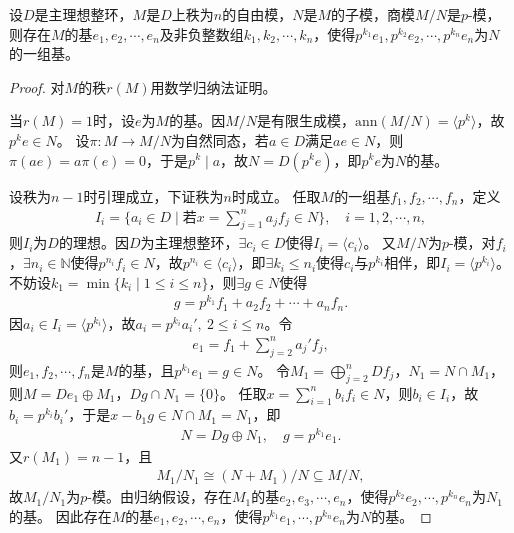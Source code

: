 \documentclass[../../main.tex]{subfiles}%
\begin{document}
\begin{lemma}
设$D$是主理想整环，$M$是$D$上秩为$n$的自由模，$N$是$M$的子模，商模$M/N$是$p$-模，则存在$M$的基$e_1,e_2,\cdots,e_n$及非负整数组$k_1,k_2,\cdots,k_n$，使得$p^{k_1}e_1,p^{k_2}e_2,\cdots,p^{k_n}e_n$为$N$的一组基。
\end{lemma}
\begin{proof}

对$M$的秩$r(M)$用数学归纳法证明。

当$r(M)=1$时，设$e$为$M$的基。因$M/N$是有限生成模，$\mathrm{ann}(M/N)=\langle p^k\rangle$，故$p^ke\in N$。
设$\pi:M\to M/N$为自然同态，若$a\in D$满足$ae\in N$，则$\pi(ae)=a\pi(e)=0$，于是$p^k\mid a$，故$N=D(p^ke)$，即$p^ke$为$N$的基。

设秩为$n-1$时引理成立，下证秩为$n$时成立。
任取$M$的一组基$f_1,f_2,\cdots,f_n$，定义
\begin{align*}
I_i=\{a_i\in D\mid \text{若}x=\sum\limits_{j=1}^{n}a_jf_j\in N\},\quad i=1,2,\cdots,n,
\end{align*}
则$I_i$为$D$的理想。因$D$为主理想整环，$\exists c_i\in D$使得$I_i=\langle c_i\rangle$。
又$M/N$为$p$-模，对$f_i$，$\exists n_i\in\mathbb{N}$使得$p^{n_i}f_i\in N$，故$p^{n_i}\in\langle c_i\rangle$，即$\exists k_i\leqslant n_i$使得$c_i$与$p^{k_i}$相伴，即$I_i=\langle p^{k_i}\rangle$。
不妨设$k_1=\min\{k_i\mid 1\leqslant i\leqslant n\}$，则$\exists g\in N$使得
\begin{align*}
g=p^{k_1}f_1+a_2f_2+\cdots+a_nf_n.
\end{align*}
因$a_i\in I_i=\langle p^{k_i}\rangle$，故$a_i=p^{k_i}a_i',\ 2\leqslant i\leqslant n$。令
\begin{align*}
e_1=f_1+\sum\limits_{j=2}^{n}a_j'f_j,
\end{align*}
则$e_1,f_2,\cdots,f_n$是$M$的基，且$p^{k_1}e_1=g\in N$。
令$M_1=\bigoplus\limits_{j=2}^{n}Df_j$，$N_1=N\cap M_1$，则$M=De_1\oplus M_1$，$Dg\cap N_1=\{0\}$。
任取$x=\sum\limits_{i=1}^{n}b_if_i\in N$，则$b_i\in I_i$，故$b_i=p^{k_i}b_i'$，于是$x-b_1g\in N\cap M_1=N_1$，即
\begin{align*}
N=Dg\oplus N_1,\quad g=p^{k_1}e_1.
\end{align*}
又$r(M_1)=n-1$，且
\begin{align*}
M_1/N_1\cong (N+M_1)/N\subseteq M/N,
\end{align*}
故$M_1/N_1$为$p$-模。由归纳假设，存在$M_1$的基$e_2,e_3,\cdots,e_n$，使得$p^{k_2}e_2,\cdots,p^{k_n}e_n$为$N_1$的基。
因此存在$M$的基$e_1,e_2,\cdots,e_n$，使得$p^{k_1}e_1,\cdots,p^{k_n}e_n$为$N$的基。

\end{proof}
\end{document}

